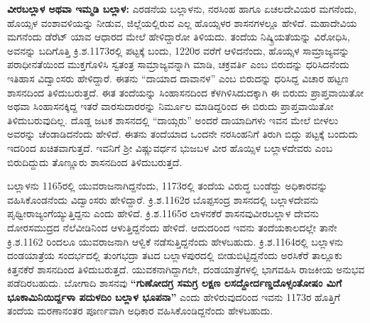 \textbf{ವೀರಬಲ್ಲಾಳ ಅಥವಾ ಇಮ್ಮಡಿ ಬಲ್ಲಾಳ:} ಎರಡನೆಯ ಬಲ್ಲಾಳನು, ನರಸಿಂಹ ಹಾಗೂ ಏಚಲದೇವಿಯರ ಮಗನೆಂದು, ಹೊಯ್ಸಳ ವಂಶಾವಳಿಯನ್ನು ನೀಡುವ, ಜಿಲ್ಲೆಯಲ್ಲಿರುವ ಎಲ್ಲ ಹೊಯ್ಸಳರ ಶಾಸನಗಳಲ್ಲೂ ಹೇಳಿದೆ. ಮಹಾದೇವಿಯ ಮಗನೆಂದು ಡೆರೆಟ್​ ಯಾವ ಆಧಾರದ ಮೇಲೆ ಹೇಳಿದ್ದಾರೋ ತಿಳಿಯದು. ತಂದೆಯ ನಿಷ್ಕ್ರಿಯತೆಯನ್ನು ವಿರೋಧಿಸಿ, ಅವನನ್ನು ಬದಿಗೊತ್ತಿ ಕ್ರಿ.ಶ.1173ರಲ್ಲಿ ಪಟ್ಟಕ್ಕೆ ಬಂದು, 1220ರ ವರೆಗೆ ಆಳಿದನೆಂದು, ಹೊಯ್ಸಳ ಸಾಮ್ರಾಜ್ಯವನ್ನು ಪರಾಧೀನತೆಯಿಂದ ಮುಕ್ತಗೊಳಿಸಿ ಸ್ವತಂತ್ರ ಸಾಮ್ರಾಜ್ಯವನ್ನಾಗಿ ಮಾಡಿ, ಚಕ್ರವರ್ತಿ ಎಂಬ ಬಿರುದನ್ನು ಧರಿಸಿದನೆಂದು ಇತಿಹಾಸ ವಿದ್ವಾಂಸರು ಹೇಳಿದ್ದಾರೆ. ಈತನು “ದಾಯಾದ ದಾವಾನಳ” ಎಂಬ ಬಿರುದನ್ನು ಧರಿಸಿದ್ದ ವಿಚಾರ ಹಟ್ಟಣ ಶಾಸನದಿಂದ ತಿಳಿದುಬರುತ್ತದೆ. ಈತ ತಂದೆಯನ್ನು ಸಿಂಹಾಸನದಿಂದ ಕೆಳಗಿಳಿಸಿದುದಕ್ಕಾಗಿ ಈ ಬಿರುದು ಪ್ರಾಪ್ತವಾಯಿತೋ ಅಥವಾ ಸಿಂಹಾಸನಕ್ಕಿದ್ದ ಇತರೆ ವಾರಸುದಾರರನ್ನು ನಿರ್ಮೂಲ ಮಾಡಿದ್ದರಿಂದ ಈ ಬಿರುದು ಪ್ರಾಪ್ತವಾಯಿತೋ ತಿಳಿದುಬರುವುದಿಲ್ಲ. ದೊಡ್ಡ ಜಟಕ ಶಾಸನದಲ್ಲಿ “ದಾಯ್ಗರು” ಅಂದರೆ ದಾಯಾದಿಗಳು ಇವನ ಮೇಲೆ ಬೀಳಲು ಅವರನ್ನು ಚೆಂಡಾಡಿದನೆಂದು ಹೇಳಿದೆ. ಈತನು ತಂದೆಯಾದ ಒಂದನೇ ನರಸಿಂಹನಿಗೆ ತಿರುಗಿ ಬಿದ್ದು ಪಟ್ಟಕ್ಕೆ ಬಂದುದು ಇದರಿಂದ ಖಚಿತವಾಗುತ್ತದೆ. ಇವನಿಗೆ ಶ‍್ರೀ ವಿಷ್ಣುವರ್ಧನ ಭುಜಬಳ ವೀರ ಹೊಯ್ಸಿಳ ಬಲ್ಲಾಳದೇವರು ಎಂಬ ಬಿರುದಿದ್ದುದು ತೊಣ್ಣೂರು ಶಾಸನದಿಂದ ತಿಳಿದುಬರುತ್ತದೆ.

ಬಲ್ಲಾಳನು 1165ರಲ್ಲಿ ಯುವರಾಜನಾಗಿದ್ದನೆಂದು, 1173ರಲ್ಲಿ ತಂದೆಯ ವಿರುದ್ಧ ಬಂಡೆದ್ದು ಅಧಿಕಾರವನ್ನು ವಹಿಸಿಕೊಂಡ\-ನೆಂದು ವಿದ್ವಾಂಸರು ಹೇಳಿದ್ದಾರೆ. ಕ್ರಿ.ಶ.1162ರ ಬೊಪ್ಪಸಂದ್ರ ಶಾಸನದಲ್ಲಿ ಬಲ್ಲಾಳದೇವನು ಪೃಥ್ವೀರಾಜ್ಯಂಗೆಯ್ಯುತ್ತಿದ್ದನು ಎಂದು ಹೇಳಿದೆ. ಕ್ರಿ.ಶ.1165ರ ಲಾಳನಕೆರೆ ಶಾಸನವುವೀರಬಲ್ಲಾಳ ದೇವನು ದೋರಸಮುದ್ರದ ನೆಲೆವೀಡಿನಿಂದ ಆಳುತ್ತಿದ್ದನೆಂದು ಹೇಳಿದೆ. ಆದುದರಿಂದ ಇವನು ತಂದೆಯಕಾಲದಲ್ಲೇ ತಾನೇ ಕ್ರಿ.ಶ.1162 ರಿಂದಲೂ ಯುವರಾಜನಾಗಿ ಆಳ್ವಿಕೆ ನಡೆಸುತ್ತಿದ್ದನೆಂದು ಹೇಳಬಹುದು. ಕ್ರಿ.ಶ.1164ರಲ್ಲಿ ಬಲ್ಲಾಳನು ದಂಡಯಾತ್ರೆಯ ಸಂದರ್ಭದಲ್ಲಿ ತುಂಗಭದ್ರಾ ತಟದ ಬಲ್ಲಾಳಪುರದಲ್ಲಿ ಬೀಡುಬಿಟ್ಟಿದ್ದನೆಂದು ಅರಸಿಕೆರೆ ತಾಲ್ಲೂಕು ಕಿತ್ತನಕೆರೆ ಶಾಸನದಿಂದ ತಿಳಿದುಬರುತ್ತದೆ. ಯುವಕನಾಗಿದ್ದಾಗಲೇ, ದಂಡಯಾತ್ರೆಗಳಲ್ಲಿ ಭಾಗವಹಿಸಿ ರಾಜಕೀಯ ಅನುಭವ ಪಡೆದಿರಬಹುದು. ಬೋಗಾದಿ ಶಾಸನವು \textbf{“ಗುಣೋದಗ್ರ ಸಮಗ್ರ ಲಕ್ಷಣ ಲಸದ್ದೋರ್ದಣ್ಡದೊಳ್ಸಂತೋಷಂ ಮಿಗೆ ಭೂಕಾಮಿನಿಯಿರ್ದ್ದಳಾ ಪದುಳದಿಂ ಬಲ್ಲಾಳ ಭೂಪನಾ”} ಎಂದು ಹೇಳಿರುವುದರಿಂದ ಇವನು 1173ರ ಹೊತ್ತಿಗೆ ತಂದೆಯ ಮರಣಾನಂತರ ಪೂರ್ಣವಾಗಿ ಅಧಿಕಾರ ವಹಿಸಿಕೊಂಡಿದ್ದನೆಂದು ಹೇಳಬಹುದು.

